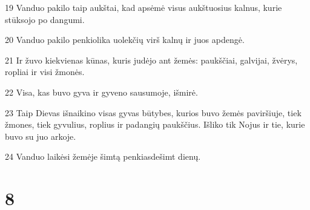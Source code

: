\par 19 Vanduo pakilo taip aukštai, kad apsėmė visus aukštuosius kalnus, kurie stūksojo po dangumi. 
\par 20 Vanduo pakilo penkiolika uolekčių virš kalnų ir juos apdengė. 
\par 21 Ir žuvo kiekvienas kūnas, kuris judėjo ant žemės: paukščiai, galvijai, žvėrys, ropliai ir visi žmonės. 
\par 22 Visa, kas buvo gyva ir gyveno sausumoje, išmirė. 
\par 23 Taip Dievas išnaikino visas gyvas būtybes, kurios buvo žemės paviršiuje, tiek žmones, tiek gyvulius, roplius ir padangių paukščius. Išliko tik Nojus ir tie, kurie buvo su juo arkoje. 
\par 24 Vanduo laikėsi žemėje šimtą penkiasdešimt dienų.



\chapter{8}

